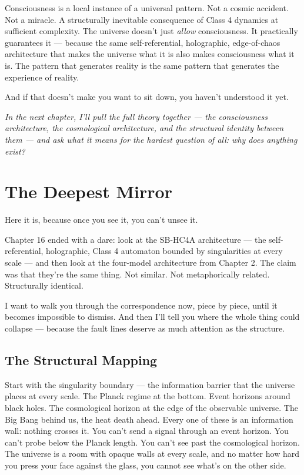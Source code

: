 \documentclass[11pt, twoside, openright]{book}
\begin{document}
Consciousness is a local instance of a universal pattern. Not a cosmic accident. Not a miracle. A structurally inevitable consequence of Class 4 dynamics at sufficient complexity. The universe doesn't just \textit{allow} consciousness. It practically guarantees it --- because the same self-referential, holographic, edge-of-chaos architecture that makes the universe what it is also makes consciousness what it is. The pattern that generates reality is the same pattern that generates the experience of reality.

And if that doesn't make you want to sit down, you haven't understood it yet.


\textit{In the next chapter, I'll pull the full theory together --- the consciousness architecture, the cosmological architecture, and the structural identity between them --- and ask what it means for the hardest question of all: why does anything exist?}


\chapter{The Deepest Mirror}

Here it is, because once you see it, you can't unsee it.

Chapter 16 ended with a dare: look at the SB-HC4A architecture --- the self-referential, holographic, Class 4 automaton bounded by singularities at every scale --- and then look at the four-model architecture from Chapter 2. The claim was that they're the same thing. Not similar. Not metaphorically related. Structurally identical.

I want to walk you through the correspondence now, piece by piece, until it becomes impossible to dismiss. And then I'll tell you where the whole thing could collapse --- because the fault lines deserve as much attention as the structure.

\section*{The Structural Mapping}

Start with the singularity boundary --- the information barrier that the universe places at every scale. The Planck regime at the bottom. Event horizons around black holes. The cosmological horizon at the edge of the observable universe. The Big Bang behind us, the heat death ahead. Every one of these is an information wall: nothing crosses it. You can't send a signal through an event horizon. You can't probe below the Planck length. You can't see past the cosmological horizon. The universe is a room with opaque walls at every scale, and no matter how hard you press your face against the glass, you cannot see what's on the other side.
\end{document}
